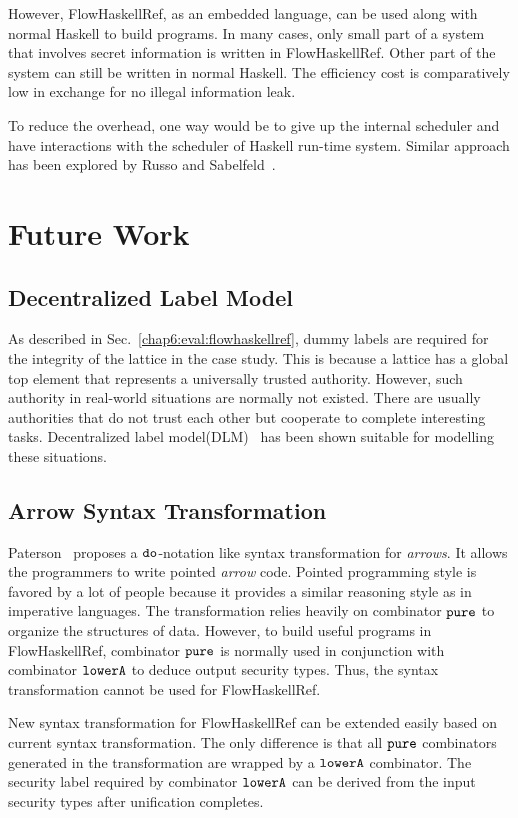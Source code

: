 \documentclass{report}
\newcommand{\co}[1]{$\cod{#1}$}
\begin{document}
However, FlowHaskellRef, as an embedded language, can be used along with normal Haskell to build programs.
In many cases, only small part of a system that involves secret information is 
written in FlowHaskellRef. Other part of the system can still be written in normal Haskell. 
The efficiency cost is comparatively low in exchange for no illegal information leak.

To reduce the overhead, one way would be to give up the internal scheduler and have interactions with the scheduler 
of Haskell run-time system. Similar approach has been explored by Russo and Sabelfeld~\cite{Russo:Sabelfeld:CSFW06}.

\section{Future Work}
\subsection{Decentralized Label Model}
As described in Sec.~\ref{chap6:eval:flowhaskellref}, dummy labels are required for the integrity
of the lattice in the case study. This is because a lattice has a global top element that
represents a universally trusted authority. However, such authority in real-world situations are normally 
not existed. There are usually authorities that do not trust each other but cooperate to complete
interesting tasks. Decentralized label model(DLM)~\cite{Myers:Liskov:TSEM2000} has been shown suitable for
modelling these situations.

\subsection{Arrow Syntax Transformation}
Paterson~\cite{Paterson:ICFP01} proposes a \co{do}-notation like syntax transformation
for {\em arrows}. It allows the programmers to write pointed {\em arrow} code. 
Pointed programming style is favored by a lot of people because it provides a similar
reasoning style as in imperative languages.
The transformation relies heavily on combinator \co{pure} to organize the structures of data. 
However, to build useful programs in FlowHaskellRef, combinator \co{pure} is normally used in 
conjunction with combinator \co{lowerA} to deduce output security types. Thus, the syntax transformation 
cannot be used for FlowHaskellRef. 

New syntax transformation for FlowHaskellRef can be extended easily based on current syntax transformation.
The only difference is that all \co{pure} combinators generated in the transformation are wrapped by a \co{lowerA} 
combinator. The security label
required by combinator \co{lowerA} can be derived from the input security types after unification completes.
\end{document}
